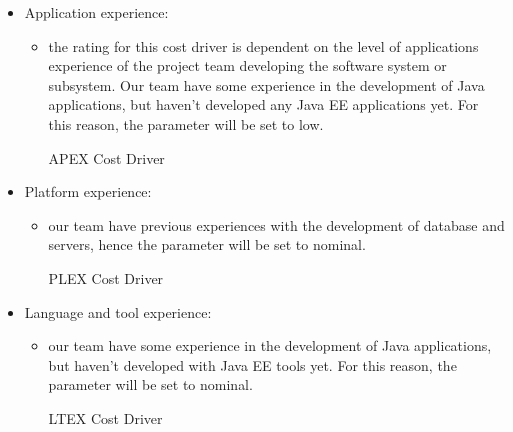 \begin{itemize}
	\item Application experience: 
	\begin{itemize}
	\item[] the rating for this cost driver is dependent on the level of applications experience of the project team developing the software system or subsystem. 
Our team have some experience in the development of Java applications, but haven't developed any Java EE applications yet. For this reason, the parameter will be set to low.
	\begin{costdriverstable}{APEX Cost Driver}
		\hline
	\end{costdriverstable}
	\end{itemize}
\end{itemize}

\begin{itemize}
	\item Platform experience: 
	\begin{itemize}
	\item[] our team have previous experiences with the development of database and servers, hence the parameter will be set to nominal.
	\begin{costdriverstable}{PLEX Cost Driver}
		\hline
	\end{costdriverstable}
	\end{itemize}
\end{itemize}

\begin{itemize}
	\item Language and tool experience: 
	\begin{itemize}
	\item[] our team have some experience in the development of Java applications, but haven't developed with Java EE tools yet. For this reason, the parameter will be set to nominal.
	\begin{costdriverstable}{LTEX Cost Driver}
		\hline
	\end{costdriverstable}
	\end{itemize}
\end{itemize}

